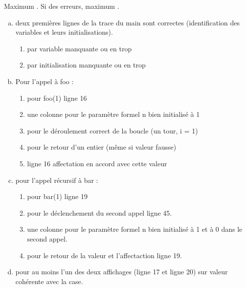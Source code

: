 \begin{correction}
\begin{table}
  \end{table}
\end{correction}

\begin{baremeenv}
\newpage
 Maximum . Si des erreurs, maximum .
  \begin{enumerate}[(a)]
\item {} deux premières lignes de la trace du main sont correctes
  (identification des variables et leurs initialisations).
  \begin{enumerate}[$\ast$]
  \item {} par variable manquante ou en trop
  \item {} par initialisation manquante ou en trop
  \end{enumerate}
\item {} Pour l'appel à foo :
  \begin{enumerate}[$\ast$]
  \item {} pour foo(1) ligne 16 
\item {} une colonne pour le paramètre formel n bien
  initialisé à 1 
\item {} pour le déroulement correct de la boucle (un tour, i
  = 1)
\item {} pour le retour d'un entier (même si valeur fausse)
\item {} ligne 16 affectation en accord avec cette valeur
 \end{enumerate}
\item {}  pour l'appel récursif à bar :
  \begin{enumerate}[$\ast$]
  \item {} pour bar(1) ligne 19 
\item {} pour le déclenchement du second appel ligne 45.
\item {} une colonne pour le paramètre formel n bien
  initialisé à 1 et à 0 dans le second appel.
\item {} pour le retour de la valeur et l'affectaction ligne 19.
\end{enumerate}
\item {} pour au moins l'un des deux affichages (ligne 17 et
  ligne 20) sur valeur cohérente avec la case.
\end{enumerate}
\end{baremeenv}

